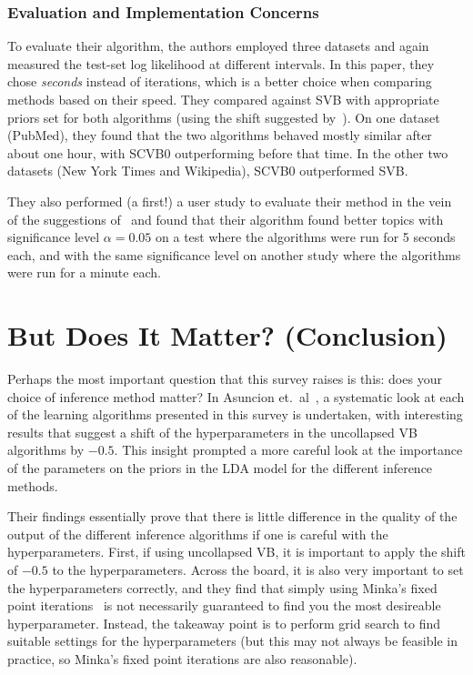 \documentclass[11pt]{article}
\begin{document}
\subsubsection{Evaluation and Implementation Concerns}

To evaluate their algorithm, the authors employed three datasets and again
measured the test-set log likelihood at different intervals. In this paper,
they chose \emph{seconds} instead of iterations, which is a better choice
when comparing methods based on their speed. They compared against SVB with
appropriate priors set for both algorithms (using the shift suggested
by~\cite{Asuncion:2009:onsmoothing}). On one dataset (PubMed), they found
that the two algorithms behaved mostly similar after about one hour, with
SCVB0 outperforming before that time. In the other two datasets (New York
Times and Wikipedia), SCVB0 outperformed SVB.

They also performed (a first!) a user study to evaluate their method in the
vein of the suggestions of~\cite{Chang:2009:tealeaves} and found that their
algorithm found better topics with significance level $\alpha = 0.05$ on a
test where the algorithms were run for 5 seconds each, and with the same
significance level on another study where the algorithms were run for a
minute each.

\section{But Does It Matter? (Conclusion)}

Perhaps the most important question that this survey raises is this:
does your choice of inference method matter? In Asuncion et.\
al~\cite{Asuncion:2009:onsmoothing}, a systematic look at each of the
learning algorithms presented in this survey is undertaken, with
interesting results that suggest a shift of the hyperparameters in the
uncollapsed VB algorithms by $-0.5$. This insight prompted a more careful
look at the importance of the parameters on the priors in the LDA model for
the different inference methods.

Their findings essentially prove that there is little difference in the
quality of the output of the different inference algorithms if one is
careful with the hyperparameters. First, if using uncollapsed VB, it is
important to apply the shift of $-0.5$ to the hyperparameters. Across the
board, it is also very important to set the hyperparameters correctly, and
they find that simply using Minka's fixed point
iterations~\cite{Minka:2000:fpiter} is not necessarily guaranteed to find you
the most desireable hyperparameter.  Instead, the takeaway point is to perform
grid search to find suitable settings for the hyperparameters (but this may not
always be feasible in practice, so Minka's fixed point iterations are also
reasonable).
\end{document}
